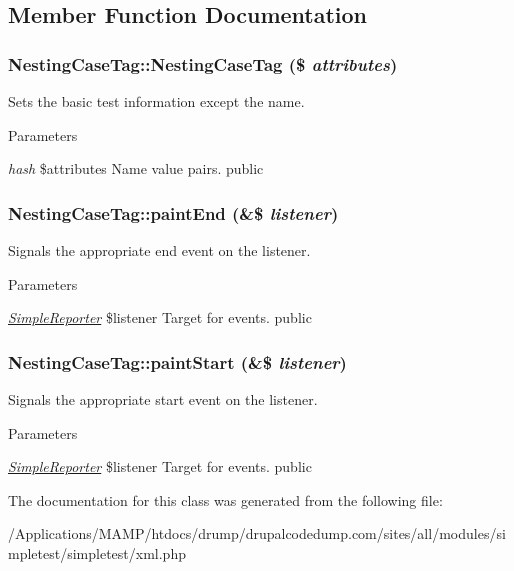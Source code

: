 \subsection{Member Function Documentation}
\hypertarget{class_nesting_case_tag_a4e43ead868e70800531012f34e7b0f06}{
\subsubsection[{NestingCaseTag}]{\setlength{\rightskip}{0pt plus 5cm}NestingCaseTag::NestingCaseTag (\$ {\em attributes})}}
\label{class_nesting_case_tag_a4e43ead868e70800531012f34e7b0f06}
Sets the basic test information except the name. 
\begin{DoxyParams}{Parameters}
\item[{\em hash}]\$attributes Name value pairs.  public \end{DoxyParams}
\hypertarget{class_nesting_case_tag_af3517ffbfd868a92d4df6b0433f5a456}{
\subsubsection[{paintEnd}]{\setlength{\rightskip}{0pt plus 5cm}NestingCaseTag::paintEnd (\&\$ {\em listener})}}
\label{class_nesting_case_tag_af3517ffbfd868a92d4df6b0433f5a456}
Signals the appropriate end event on the listener. 
\begin{DoxyParams}{Parameters}
\item[{\em \hyperlink{class_simple_reporter}{SimpleReporter}}]\$listener Target for events.  public \end{DoxyParams}
\hypertarget{class_nesting_case_tag_a4c7de3322b2b23964f43306fe4fbd52d}{
\subsubsection[{paintStart}]{\setlength{\rightskip}{0pt plus 5cm}NestingCaseTag::paintStart (\&\$ {\em listener})}}
\label{class_nesting_case_tag_a4c7de3322b2b23964f43306fe4fbd52d}
Signals the appropriate start event on the listener. 
\begin{DoxyParams}{Parameters}
\item[{\em \hyperlink{class_simple_reporter}{SimpleReporter}}]\$listener Target for events.  public \end{DoxyParams}


The documentation for this class was generated from the following file:\begin{DoxyCompactItemize}
\item 
/Applications/MAMP/htdocs/drump/drupalcodedump.com/sites/all/modules/simpletest/simpletest/xml.php\end{DoxyCompactItemize}
